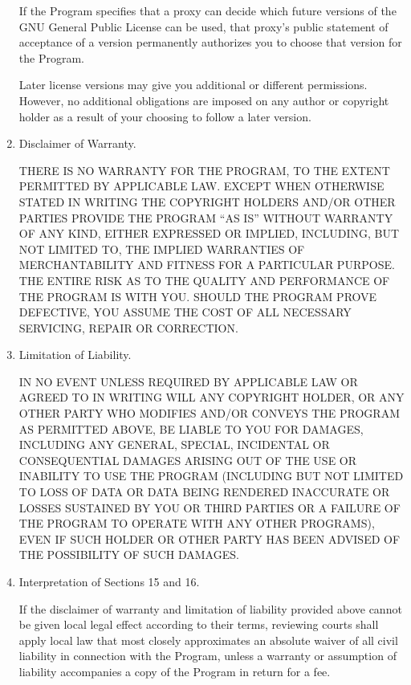 \documentclass[11pt,twoside,fleqn,openright,titlepage]{cslreport}
\begin{document}
\begin{small}
\begin{enumerate}
If the Program specifies that a proxy can decide which future
versions of the GNU General Public License can be used, that proxy's
public statement of acceptance of a version permanently authorizes you
to choose that version for the Program.

Later license versions may give you additional or different
permissions.  However, no additional obligations are imposed on any
author or copyright holder as a result of your choosing to follow a
later version.

\item Disclaimer of Warranty.

\begin{sloppypar}
 THERE IS NO WARRANTY FOR THE PROGRAM, TO THE EXTENT PERMITTED BY
 APPLICABLE LAW.  EXCEPT WHEN OTHERWISE STATED IN WRITING THE
 COPYRIGHT HOLDERS AND/OR OTHER PARTIES PROVIDE THE PROGRAM ``AS IS''
 WITHOUT WARRANTY OF ANY KIND, EITHER EXPRESSED OR IMPLIED,
 INCLUDING, BUT NOT LIMITED TO, THE IMPLIED WARRANTIES OF
 MERCHANTABILITY AND FITNESS FOR A PARTICULAR PURPOSE.  THE ENTIRE
 RISK AS TO THE QUALITY AND PERFORMANCE OF THE PROGRAM IS WITH YOU.
 SHOULD THE PROGRAM PROVE DEFECTIVE, YOU ASSUME THE COST OF ALL
 NECESSARY SERVICING, REPAIR OR CORRECTION.
\end{sloppypar}

\item Limitation of Liability.

 IN NO EVENT UNLESS REQUIRED BY APPLICABLE LAW OR AGREED TO IN
 WRITING WILL ANY COPYRIGHT HOLDER, OR ANY OTHER PARTY WHO MODIFIES
 AND/OR CONVEYS THE PROGRAM AS PERMITTED ABOVE, BE LIABLE TO YOU FOR
 DAMAGES, INCLUDING ANY GENERAL, SPECIAL, INCIDENTAL OR CONSEQUENTIAL
 DAMAGES ARISING OUT OF THE USE OR INABILITY TO USE THE PROGRAM
 (INCLUDING BUT NOT LIMITED TO LOSS OF DATA OR DATA BEING RENDERED
 INACCURATE OR LOSSES SUSTAINED BY YOU OR THIRD PARTIES OR A FAILURE
 OF THE PROGRAM TO OPERATE WITH ANY OTHER PROGRAMS), EVEN IF SUCH
 HOLDER OR OTHER PARTY HAS BEEN ADVISED OF THE POSSIBILITY OF SUCH
 DAMAGES.

\item Interpretation of Sections 15 and 16.

If the disclaimer of warranty and limitation of liability provided
above cannot be given local legal effect according to their terms,
reviewing courts shall apply local law that most closely approximates
an absolute waiver of all civil liability in connection with the
Program, unless a warranty or assumption of liability accompanies a
copy of the Program in return for a fee.


\end{enumerate}
\end{small}
\end{document}
